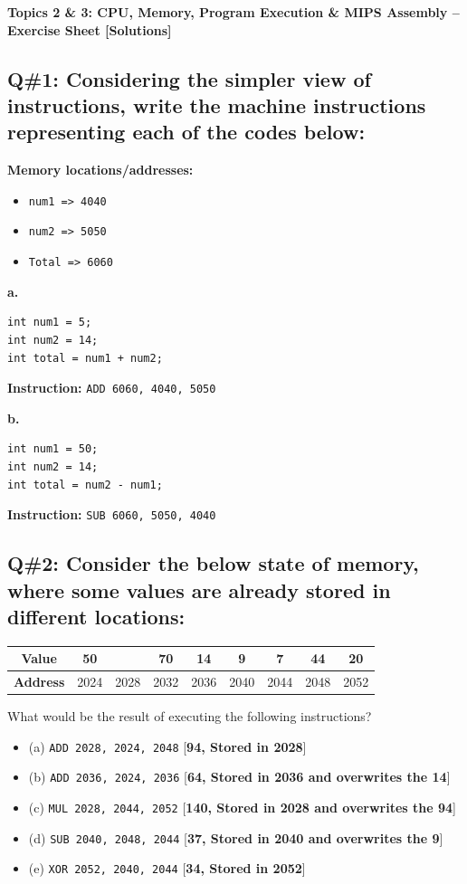 \textbf{Topics 2 \& 3: CPU, Memory, Program Execution \& MIPS Assembly – Exercise Sheet [Solutions]}

\subsection{Q\#1: Considering the simpler view of instructions, write the machine instructions representing each of the codes below:}
\textbf{Memory locations/addresses:}
\begin{itemize}
  \item \texttt{num1 => 4040}
  \item \texttt{num2 => 5050}
  \item \texttt{Total => 6060}
\end{itemize}

\textbf{a.}
\begin{lstlisting}
int num1 = 5;
int num2 = 14;
int total = num1 + num2;
\end{lstlisting}

\textbf{Instruction:} \texttt{ADD 6060, 4040, 5050}

\textbf{b.}
\begin{lstlisting}
int num1 = 50;
int num2 = 14;
int total = num2 - num1;
\end{lstlisting}

\textbf{Instruction:} \texttt{SUB 6060, 5050, 4040}
\subsection{Q\#2: Consider the below state of memory, where some values are already stored in different locations:}
\begin{center}
\begin{tabular}{|c|c|c|c|c|c|c|c|c|}
\hline
\textbf{Value} & 50 & & 70 & 14 & 9 & 7 & 44 & 20 \\
\hline
\textbf{Address} & 2024 & 2028 & 2032 & 2036 & 2040 & 2044 & 2048 & 2052 \\
\hline
\end{tabular}
\end{center}

What would be the result of executing the following instructions?

\begin{itemize}
  \item (a) \texttt{ADD 2028, 2024, 2048} \hfill [\textbf{94, Stored in 2028}]
  \item (b) \texttt{ADD 2036, 2024, 2036} \hfill [\textbf{64, Stored in 2036 and overwrites the 14}]
  \item (c) \texttt{MUL 2028, 2044, 2052} \hfill [\textbf{140, Stored in 2028 and overwrites the 94}]
  \item (d) \texttt{SUB 2040, 2048, 2044} \hfill [\textbf{37, Stored in 2040 and overwrites the 9}]
  \item (e) \texttt{XOR 2052, 2040, 2044} \hfill [\textbf{34, Stored in 2052}]
\end{itemize}

